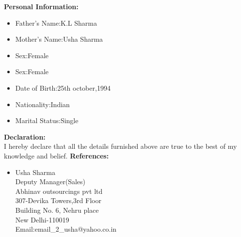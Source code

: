 \documentclass[10pt,a4paper]{article}
\begin{document}
\begin{flushleft}
		 \textbf{Personal Information:}\\
		 
		 \begin{itemize}
		 	\item Father's Name:K.L Sharma\\
		 	\item Mother's Name:Usha Sharma\\
		 	\item Sex:Female\\
		 	\item Sex:Female\\
		 	\item Date of Birth:25th october,1994\\
		 	\item Nationality:Indian\\
		 	\item Marital Status:Single\\
		 \end{itemize}
		   \textbf{ Declaration: }\\
		   I hereby declare that all the details furnished above are true to the best of my knowledge and belief.
		   \medskip
		   \textbf{ References: }\\
		   
		   \begin{itemize}
		   	\item Usha Sharma\\
		   	Deputy Manager(Sales) \\
		   	Abhinav outsourcings pvt ltd\\
		   	307-Devika Towers,3rd Floor\\
		   	Building No. 6, Nehru place\\
		   	New Delhi-110019\\
		   	Email:email\_2\_usha@yahoo.co.in
		   	
		   \end{itemize}
	
\end{flushleft}

 
\end{document}
